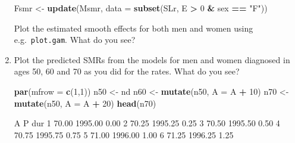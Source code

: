 \documentclass[
]{book}
\newenvironment{Shaded}{\begin{snugshade}}{\end{snugshade}}
\newcommand{\AttributeTok}[1]{\textcolor[rgb]{0.13,0.29,0.53}{#1}}
\newcommand{\DecValTok}[1]{\textcolor[rgb]{0.00,0.00,0.81}{#1}}
\newcommand{\FunctionTok}[1]{\textcolor[rgb]{0.13,0.29,0.53}{\textbf{#1}}}
\newcommand{\NormalTok}[1]{#1}
\newcommand{\OtherTok}[1]{\textcolor[rgb]{0.56,0.35,0.01}{#1}}
\newcommand{\SpecialCharTok}[1]{\textcolor[rgb]{0.81,0.36,0.00}{\textbf{#1}}}
\newcommand{\StringTok}[1]{\textcolor[rgb]{0.31,0.60,0.02}{#1}}
\begin{document}
\begin{enumerate}
\begin{Shaded}
\begin{Highlighting}[]
\NormalTok{Fsmr }\OtherTok{\textless{}{-}} \FunctionTok{update}\NormalTok{(Msmr, }\AttributeTok{data =} \FunctionTok{subset}\NormalTok{(SLr, E }\SpecialCharTok{\textgreater{}} \DecValTok{0} \SpecialCharTok{\&}\NormalTok{ sex }\SpecialCharTok{==} \StringTok{"F"}\NormalTok{))}
\end{Highlighting}
\end{Shaded}

  Plot the estimated smooth effects for both men and women using
  e.g.~\texttt{plot.gam}. What do you see?
\item
  Plot the predicted SMRs from the models for men and women
  diagnosed in ages 50, 60 and 70 as you did for the rates. What do
  you see?

\begin{Shaded}
\begin{Highlighting}[]
\FunctionTok{par}\NormalTok{(}\AttributeTok{mfrow =} \FunctionTok{c}\NormalTok{(}\DecValTok{1}\NormalTok{,}\DecValTok{1}\NormalTok{))}
\NormalTok{n50 }\OtherTok{\textless{}{-}}\NormalTok{ nd}
\NormalTok{n60 }\OtherTok{\textless{}{-}} \FunctionTok{mutate}\NormalTok{(n50, }\AttributeTok{A =}\NormalTok{ A }\SpecialCharTok{+} \DecValTok{10}\NormalTok{)}
\NormalTok{n70 }\OtherTok{\textless{}{-}} \FunctionTok{mutate}\NormalTok{(n50, }\AttributeTok{A =}\NormalTok{ A }\SpecialCharTok{+} \DecValTok{20}\NormalTok{)}
\FunctionTok{head}\NormalTok{(n70)}
\end{Highlighting}
\end{Shaded}

\begin{Shaded}
\begin{Highlighting}[]
\NormalTok{      A       P  dur}
\NormalTok{1 70.00 1995.00 0.00}
\NormalTok{2 70.25 1995.25 0.25}
\NormalTok{3 70.50 1995.50 0.50}
\NormalTok{4 70.75 1995.75 0.75}
\NormalTok{5 71.00 1996.00 1.00}
\NormalTok{6 71.25 1996.25 1.25}
\end{Highlighting}
\end{Shaded}


\end{enumerate}
\end{document}

